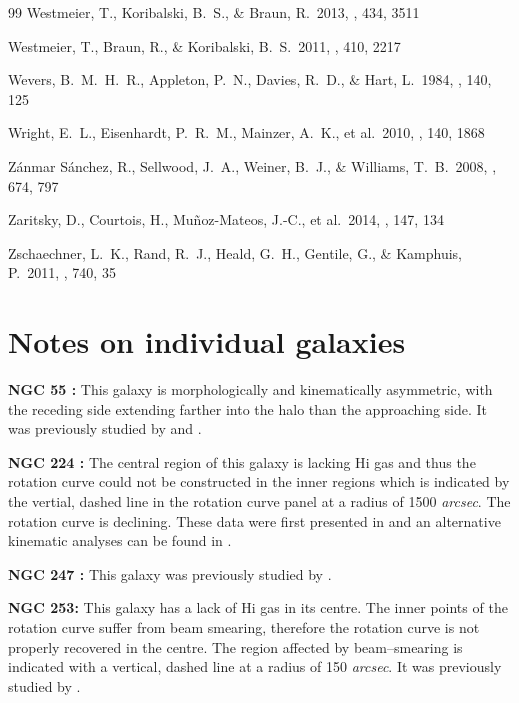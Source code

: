 \documentclass[usenatbib,useAMS]{mnras}
\begin{document}
\begin{thebibliography}{99}
 Westmeier, T., 
Koribalski, B.~S., \& Braun, R.\ 2013, \mnras, 434, 3511 

 Westmeier, T., Braun, 
R., \& Koribalski, B.~S.\ 2011, \mnras, 410, 2217

 Wevers, B.~M.~H.~R., Appleton, P.~N., Davies, R.~D., \& Hart, L.\ 1984, \aap, 140, 125 

 Wright, E.~L., 
Eisenhardt, P.~R.~M., Mainzer, A.~K., et al.\ 2010, \aj, 140, 1868 

Z{\'a}nmar S{\'a}nchez, R., Sellwood, J.~A., Weiner, B.~J., 
\& Williams, T.~B.\ 2008, \apj, 674, 797 

 Zaritsky, D., 
Courtois, H., Mu{\~n}oz-Mateos, J.-C., et al.\ 2014, \aj, 147, 134 


 Zschaechner, L.~K., 
Rand, R.~J., Heald, G.~H., Gentile, G., 
\& Kamphuis, P.\ 2011, \apj, 740, 35 


\end{thebibliography}




\appendix 

\section{Notes on individual galaxies}

\textbf{NGC 55 :} This galaxy is morphologically and kinematically
asymmetric, with the receding side extending farther into the halo than
the approaching side.  It was previously studied by \citet{ngc55} and
\citet{ngc55a}. 

\textbf{NGC 224 :} The central region of this galaxy is lacking H{\sc i}
gas and thus the rotation curve could not be constructed in the inner
regions which is indicated by the vertial, dashed line in the rotation
curve panel at a radius of 1500 {\it arcsec}.  The rotation curve is
declining.  These data were first presented in \citet{andromeda} and an
alternative kinematic analyses can be found in \citet{corbelli10}. 

\textbf{NGC 247 :} This galaxy was previously studied by
\citet{carignan90}. 

\textbf{NGC 253:} This galaxy has a lack of H{\sc i} gas in its centre. 
The inner points of the rotation curve suffer from beam smearing,
therefore the rotation curve is not properly recovered in the centre. 
The region affected by beam--smearing is indicated with a vertical,
dashed line at a radius of 150 {\it arcsec}.  It was previously studied
by \citet{ngc253}. 
\end{document}
